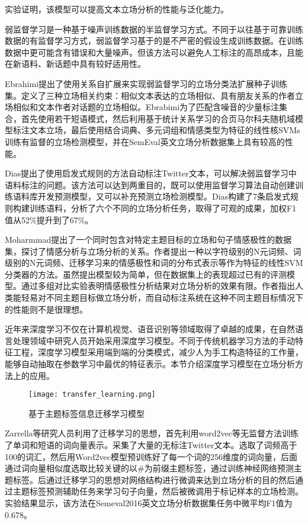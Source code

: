 实验证明，该模型可以提高文本立场分析的性能与泛化能力。

弱监督学习是一种基于噪声训练数据的半监督学习方式。不同于以往基于可靠训练数据的有监督学习方式，弱监督学习基于的是不严密的假设生成训练数据。在训练数据中更可能含有错误和大量噪声。但该方法可以避免人工标注的高昂成本，且能在新语料、新话题中具有较好适用性。

Ebrahimi提出了使用关系自扩展来实现弱监督学习的立场分类法扩展种子训练集。定义了三种立场相关约束：相似文本表达的立场相似、具有朋友关系的作者立场相似和文本作者对话题的立场相似。Ebrabimi为了匹配含噪音的少量标注集合，首先使用若干短语模式，然后利用基于统计关系学习的合页马尔科夫随机域模型标注文本立场，最后使用结合词典、多元词组和情感类型为特征的线性核SVMs训练有监督的立场检测模型，并在SemEval英文立场分析数据集上具有较高的性能。

Dias提出了使用启发式规则的方法自动标注Twitter文本，可以解决弱监督学习中语料标注的问题。该方法可以达到两重目的，既可以使用监督学习算法自动创建训练语料库开发预测模型，又可以补充预测立场检测模型。Dias构建了7条启发式规则构建训练语料，分析了六个不同的立场分析任务，取得了可观的成果，加权F1值从52\%提升到了67\%。

Moharmmad提出了一个同时包含对特定主题目标的立场和句子情感极性的数据集，探讨了情感分析与立场分析的关系。作者提出一种以字符级别的N元词频、词级别的N元词频、迁移学习来的情感极性和词的分布式表示等作为特征的线性SVM分类器的方法。虽然提出模型较为简单，但在数据集上的表现超过已有的评测模型。通过多组对比实验表明情感极性分析结果对立场分析的效果有限。作者指出人类能轻易对不同主题目标做立场分析，而自动标注系统在这种不同主题目标情况下的性能则不是很理想。



近年来深度学习不仅在计算机视觉、语音识别等领域取得了卓越的成果，在自然语言处理领域中研究人员开始采用深度学习模型。不同于传统机器学习方法的手动特征工程，深度学习模型采用端到端的分类模式，减少人为手工构造特征的工作量，能够自动抽取在参数学习中最优的特征表示。本节介绍深度学习模型在立场分析方法上的应用。

\begin{figure}[htbp]
	\centering
	\texttt{[image: transfer\_learning.png]}
	\caption[rnn_vanish]{基于主题标签信息迁移学习模型}
	\label{chart_nlpcc_best_model}
\end{figure}
Zarrella等研究人员利用了迁移学习的思想，首先利用word2vec等无监督方法训练了单词和短语的词向量表示。采集了大量的无标注Twitter文本。选取了词频高于100的词汇，然后用Word2vec模型预训练好了每一个词的256维度的词向量，后面通过词向量相似度选取比较关键的以\#为前缀主题标签，通过训练神经网络预测主题标签。后通过迁移学习的思想对网络结构进行微调来达到立场分析的目的然后通过主题标签预测辅助任务来学习句子向量，然后被微调用于标记样本的立场检测。实验结果显示，该方法在Semeval2016英文立场分析数据集任务中微平均F1值为0.678。

